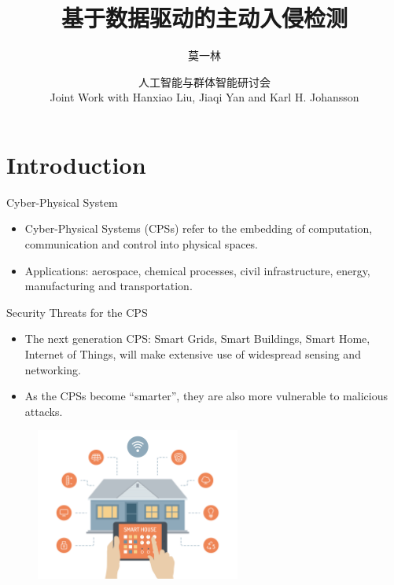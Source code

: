 \documentclass[10pt]{beamer}
\title[Secure CPS]{基于数据驱动的主动入侵检测}
\author[Yilin Mo]{莫一林}
\institute[Tsinghua]{
  清华大学 自动化系
}
\date[Nov 25, 2018]{ 人工智能与群体智能研讨会\\ 
  \small Joint Work with Hanxiao Liu, Jiaqi Yan and Karl H. Johansson}
\begin{document}
\maketitle 

\section{Introduction}

\begin{frame}{Cyber-Physical System}
  \begin{itemize}
  \item Cyber-Physical Systems (CPSs) refer to the embedding of computation, communication and control into physical spaces.
    \begin{center}
    \end{center}
  \item Applications: aerospace, chemical processes, civil infrastructure, energy, manufacturing and transportation. 
  \end{itemize}
\end{frame}

\begin{frame}{Security Threats for the CPS}
  \begin{itemize}
  \item The next generation CPS: Smart Grids, Smart Buildings, Smart Home, Internet of Things, will make extensive use of widespread sensing and networking.
  \item As the CPSs become ``smarter'', they are also more vulnerable to malicious attacks.
  \end{itemize}
  \begin{figure}[ht]
    \centering
    \includegraphics[width=0.6\textwidth]{SmartHome.jpg}
  \end{figure}
\end{frame}
\end{document}
